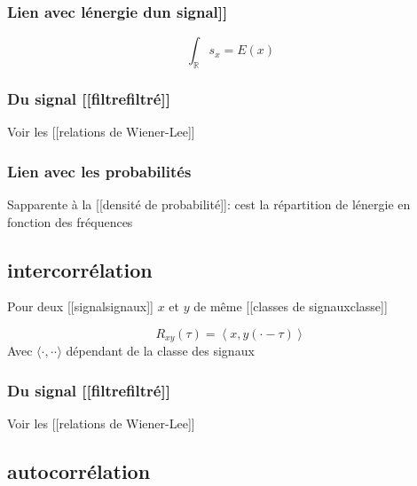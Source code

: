 \documentclass[
]{article}
\begin{document}
\hypertarget{lien-avec-luxe9nergie-dun-signal}{%
\subsubsection{Lien avec l\textquotesingle{[}{[}énergie
d\textquotesingle un
signal{]}{]}}\label{lien-avec-luxe9nergie-dun-signal}}

\[
\int_\mathbb{R} s_x = E(x)
\]

\hypertarget{du-signal-filtrefiltruxe9}{%
\subsubsection{Du signal
{[}{[}filtre\textbar filtré{]}{]}}\label{du-signal-filtrefiltruxe9}}

Voir les {[}{[}relations de Wiener-Lee{]}{]}

\hypertarget{lien-avec-les-probabilituxe9s}{%
\subsubsection{Lien avec les
probabilités}\label{lien-avec-les-probabilituxe9s}}

S\textquotesingle apparente à la {[}{[}densité de probabilité{]}{]}:
c\textquotesingle est la répartition de l\textquotesingle énergie en
fonction des fréquences

\hypertarget{intercorruxe9lation}{%
\subsection{intercorrélation}\label{intercorruxe9lation}}

Pour deux {[}{[}signal\textbar signaux{]}{]} \(x\) et \(y\) de même
{[}{[}classes de signaux\textbar classe{]}{]}

\[
R_{xy}(\tau) = \left\langle x, y(\cdot-\tau)\right\rangle\] Avec
\(\langle \cdot, \cdot\cdot \rangle\) dépendant de la classe des signaux

\hypertarget{du-signal-filtrefiltruxe9-1}{%
\subsubsection{Du signal
{[}{[}filtre\textbar filtré{]}{]}}\label{du-signal-filtrefiltruxe9-1}}

Voir les {[}{[}relations de Wiener-Lee{]}{]}

\hypertarget{autocorruxe9lation}{%
\subsection{autocorrélation}\label{autocorruxe9lation}}
\end{document}
